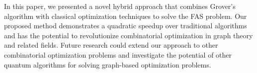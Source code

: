 In this paper, we presented a novel hybrid approach that combines Grover's algorithm with classical optimization techniques to solve the FAS problem. Our proposed method demonstrates a quadratic speedup over traditional algorithms and has the potential to revolutionize combinatorial optimization in graph theory and related fields. Future research could extend our approach to other combinatorial optimization problems and investigate the potential of other quantum algorithms for solving graph-based optimization problems.

